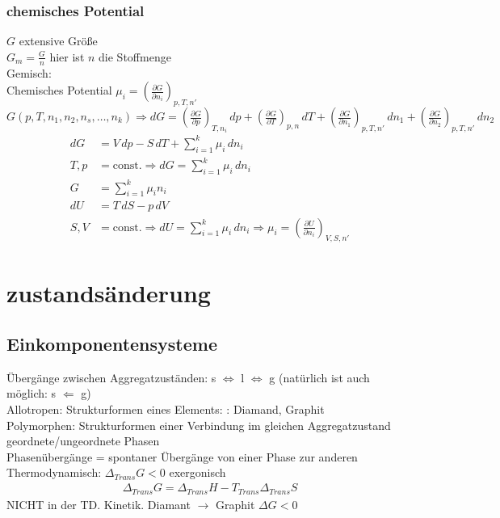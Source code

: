 \documentclass[a4paper, fleqn]{article}
\begin{document}
\subsubsection{chemisches Potential}
$G$ extensive Größe\\
$G_m = \frac{G}{n}$ hier ist $n$ die Stoffmenge\\
Gemisch:\\
Chemisches Potential $\mu_i = \left(\frac{\partial G}{\partial n_i}\right)_{p,T,n'}$\\
$G(p,T,n_1,n_2,n_s,\dots,n_k) \Rightarrow dG = \left(\frac{\partial G}{\partial p}\right)_{T,n_i}\,dp+ \left(\frac{\partial G}{\partial T}\right)_{p,n}\,dT+\left(\frac{\partial G}{\partial n_1}\right)_{p,T,n'}\,dn_1+\left(\frac{\partial G}{\partial n_2}\right)_{p,T,n'}\,dn_2$\\
\begin{align*}
    dG &= V\,dp - S\,dT + \sum_{i=1}^{k} \mu_i\,dn_i\\
    T,p &= \mathrm{const.} \Rightarrow dG = \sum_{i=1}^{k}\mu_i\,dn_i\\
    G&=\sum_{i=1}^{k} \mu_in_i\\
    dU&=T\,dS-p\,dV\\
    S,V&=\mathrm{const.} \Rightarrow dU = \sum_{i=1}^{k} \mu_i\,dn_i \Rightarrow \mu_i = \left(\frac{\partial U}{\partial n_i}\right)_{V,S,n'}
\end{align*}

\section{zustandsänderung}
\subsection{Einkomponentensysteme}
Übergänge zwischen Aggregatzuständen: s $\Leftrightarrow$ l $\Leftrightarrow$ g (natürlich ist auch möglich: s $\Leftarrow$ g)\\
Allotropen: Strukturformen eines Elements: : Diamand, Graphit\\
Polymorphen: Strukturformen einer Verbindung im gleichen Aggregatzustand\\
geordnete/ungeordnete Phasen\\
Phasenübergänge = spontaner Übergänge von einer Phase zur anderen\\
Thermodynamisch: $\Delta_{Trans} G < 0$ exergonisch\\
\begin{eqnarray*}
    \Delta_{Trans}G=\Delta_{Trans} H - T_{Trans} \Delta_{Trans} S
\end{eqnarray*}
NICHT in der TD. Kinetik. Diamant $\rightarrow$ Graphit $\Delta G < 0$\\
\end{document}
